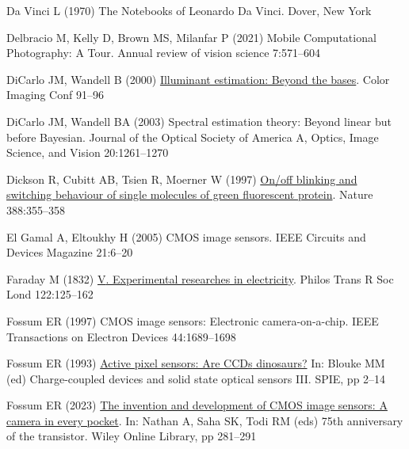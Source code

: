 \documentclass[
  letterpaper,
]{book}
\newlength{\cslhangindent}
\newenvironment{CSLReferences}[2] %
 {\begin{list}{}{%
  \setlength{\itemindent}{0pt}
  \setlength{\leftmargin}{0pt}
  \setlength{\parsep}{0pt}
  \ifodd #1
   \setlength{\leftmargin}{\cslhangindent}
   \setlength{\itemindent}{-1\cslhangindent}
  \fi
  \setlength{\itemsep}{#2\baselineskip}}}
 {\end{list}}
\begin{document}
\begin{CSLReferences}{1}{1}
Da Vinci L (1970) The {Notebooks} of {Leonardo Da Vinci}. Dover, New
York

Delbracio M, Kelly D, Brown MS, Milanfar P (2021) Mobile {Computational
Photography}: {A Tour}. Annual review of vision science 7:571--604

DiCarlo JM, Wandell B (2000)
\href{https://library.imaging.org/cic/articles/8/1/art00018}{Illuminant
estimation: Beyond the bases}. Color Imaging Conf 91--96

DiCarlo JM, Wandell BA (2003) Spectral estimation theory: {Beyond}
linear but before {Bayesian}. Journal of the Optical Society of America
A, Optics, Image Science, and Vision 20:1261--1270

Dickson R, Cubitt AB, Tsien R, Moerner W (1997)
\href{http://dx.doi.org/10.1038/41048}{On/off blinking and switching
behaviour of single molecules of green fluorescent protein}. Nature
388:355--358

El Gamal A, Eltoukhy H (2005) {CMOS} image sensors. IEEE Circuits and
Devices Magazine 21:6--20

Faraday M (1832) \href{http://dx.doi.org/10.1098/rstl.1832.0006}{{V}.
Experimental researches in electricity}. Philos Trans R Soc Lond
122:125--162

Fossum ER (1997) {CMOS} image sensors: {Electronic} camera-on-a-chip.
IEEE Transactions on Electron Devices 44:1689--1698

Fossum ER (1993)
\href{https://www.spiedigitallibrary.org/conference-proceedings-of-spie/1900/0000/Active-pixel-sensors-are-CCDs-dinosaurs/10.1117/12.148585.short}{Active
pixel sensors: Are {CCDs} dinosaurs?} In: Blouke MM (ed) Charge-coupled
devices and solid state optical sensors III. SPIE, pp 2--14

Fossum ER (2023) \href{http://dx.doi.org/10.1002/9781394202478.ch23}{The
invention and development of {CMOS} image sensors: A camera in every
pocket}. In: Nathan A, Saha SK, Todi RM (eds) 75th anniversary of the
transistor. Wiley Online Library, pp 281--291


\end{CSLReferences}
\end{document}
